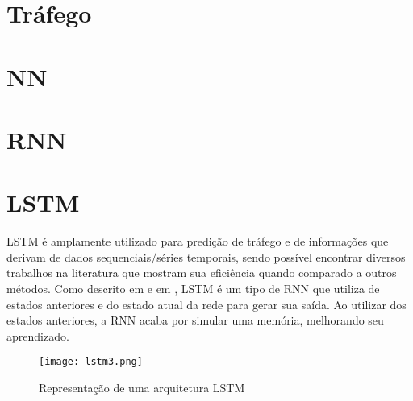 
\section{Tráfego}


\section{\acrfull{NN}}


\section{\acrfull{RNN}}






\section{\acrfull{LSTM}}

\acrshort{LSTM} é amplamente utilizado para predição de tráfego e de informações que derivam de dados sequenciais/séries temporais, sendo possível encontrar diversos trabalhos na literatura que mostram sua eficiência quando comparado a outros métodos. Como descrito em \cite{Zainab_2018} e em \cite{Xiaolei_2015}, \acrshort{LSTM} é um tipo de \acrshort{RNN} que utiliza de estados anteriores e do estado atual da rede para gerar sua saída. Ao utilizar dos estados anteriores, a \acrshort{RNN} acaba por simular uma memória, melhorando seu aprendizado. 

\begin{figure}[htb]
    \centering
    \texttt{[image: lstm3.png]}
    \label{figure:eixo}
    \caption[Representação de uma arquitetura LSTM]{Representação de uma arquitetura LSTM\footnotemark}
\end{figure}

